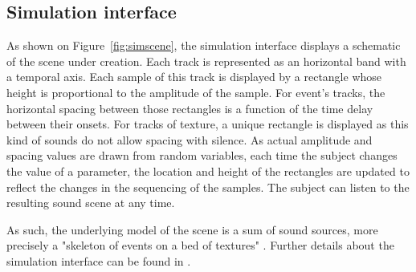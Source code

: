 \documentclass[twoside,twocolumn]{article}
\begin{document}
\subsection{Simulation interface}


As shown on Figure~\ref{fig:simscene}, the simulation interface displays a schematic of the scene under creation. Each track is represented as an horizontal band with a temporal axis. Each sample of this track is displayed by a rectangle whose height is proportional to the amplitude of the sample. For event's tracks, the horizontal spacing between those rectangles is a function of the time delay between their onsets. For tracks of texture, a unique rectangle is displayed as this kind of sounds do not allow spacing with silence. As actual amplitude and spacing values are drawn from random variables, each time the subject changes the value of a parameter, the location and height of the rectangles are updated to reflect the changes in the sequencing of the samples. The subject can listen to the resulting sound scene at any time.


As such, the underlying model of the scene is a sum of sound sources, more precisely a "skeleton of events on a bed of textures" \cite{nelken2013ear}. Further details about the simulation interface can be found in \cite{rossignol2015simscene}.


\end{document}

